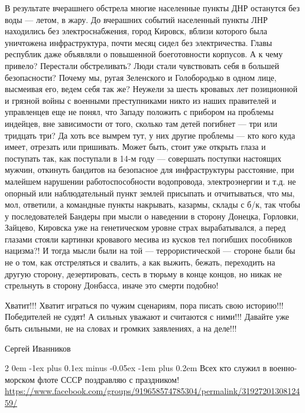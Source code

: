 \documentclass[a4paper,11pt]{extreport}
\makeatletter
\renewcommand\subsection{%
  \clearpage
    \@startsection{subsection}%
    {2}%
    {0em}%
    {-1ex plus 0.1ex minus -0.05ex}%
    {-1em plus 0.2em}%
    {\scshape\bfseries\Large}%
}
\makeatother
\begin{document}
В результате вчерашнего обстрела многие населенные пункты ДНР останутся без
воды --- летом, в жару. До вчерашних событий населенный пункты ЛНР находились без
электроснабжения, город Кировск, вблизи которого была уничтожена
инфраструктура, почти месяц сидел без электричества. Главы республик даже
объявляли о повышенной боеготовности корпусов. А к чему привело? Перестали
обстреливать? Люди стали чувствовать себя в большей безопасности? Почему мы,
ругая Зеленского и Голобородько в одном лице, высмеивая его, ведем себя так же?
Неужели за шесть кровавых лет позиционной и грязной войны с военными
преступниками никто из наших правителей и управленцев еще не понял, что Западу
положить с прибором на проблемы индейцев, вне зависимости от того, сколько там
детей погибнет --- три или тридцать три? Да хоть все вымрем тут, у них другие
проблемы --- кто кого куда имеет, отрезать или пришивать. Может быть, стоит уже
открыть глаза и поступать так, как поступали в 14-м году --- совершать поступки
настоящих мужчин, откинуть бандитов на безопасное для инфраструктуры
расстояние, при малейшем нарушении работоспособности водопровода,
электроэнергии и т.д. не опорный или наблюдательный пункт землей присыпать и
отчитываться, что мы, мол, ответили, а командные пункты накрывать, казармы,
склады с б/к, так чтобы у последователей Бандеры при мысли о наведении в
сторону Донецка, Горловки, Зайцево, Кировска уже на генетическом уровне страх
вырабатывался, а перед глазами стояли картинки кровавого месива из кусков тел
погибших пособников нацизма?! И тогда мысли были на той --- террористической —
стороне были бы не о том, как отстреляться и свалить, а как выжить, бежать,
переходить на другую сторону, дезертировать, сесть в тюрьму в конце концов, но
никак не стрельнуть в сторону Донбасса, иначе это смерти подобно!

Хватит!!! Хватит играться по чужим сценариям, пора писать свою историю!!!
Победителей не судят! А сильных уважают и считаются с ними!!! Давайте уже быть
сильными, не на словах и громких заявлениях, а на деле!!!

Сергей Иванников

  
 
 
  
\clearpage
\subsection{Всех кто служил в военно-морском флоте СССР поздравляю с праздником!}
\label{sec:26_07_2020.fb.lnr.7}
\url{https://www.facebook.com/groups/919658574785304/permalink/3192720130812459/}
\end{document}
